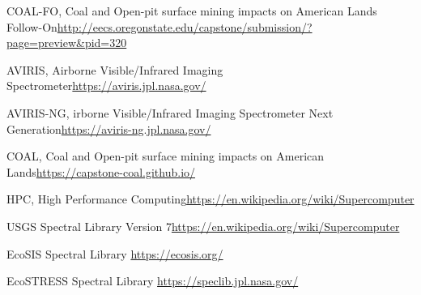 \documentclass[a4paper,12pt]{article}
\begin{document}
\newline

\noindent [1] COAL-FO, Coal and Open-pit surface mining impacts on American Lands Follow-On\newline \url{http://eecs.oregonstate.edu/capstone/submission/?page=preview\&pid=320} \newline

\noindent [2] AVIRIS, Airborne Visible/Infrared Imaging Spectrometer\newline \url{https://aviris.jpl.nasa.gov/} \newline

\noindent [3] AVIRIS-NG, irborne Visible/Infrared Imaging Spectrometer Next Generation\newline \url{https://aviris-ng.jpl.nasa.gov/}\newline

\noindent [4] COAL, Coal and Open-pit surface mining impacts on American Lands\newline \url{https://capstone-coal.github.io/} \newline

\noindent [5] HPC, High Performance Computing\newline \url{https://en.wikipedia.org/wiki/Supercomputer}\newline

\noindent [6] USGS Spectral Library Version 7\newline \url{https://en.wikipedia.org/wiki/Supercomputer}\newline

\noindent [7] EcoSIS Spectral Library \newline \url{https://ecosis.org/}\newline

\noindent [8] EcoSTRESS Spectral Library \newline \url{https://speclib.jpl.nasa.gov/}\newline
\end{document}
